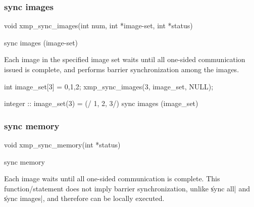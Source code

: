 



\subsubsection{sync images}

\begin{XCexample}
void xmp_sync_images(int num, int *image-set, int *status)
\end{XCexample}

\begin{XFexample}
sync images (image-set)
\end{XFexample}

Each image in the specified image set waits until all one-sided
communication issued is complete, and performs barrier synchronization
among the images.

\begin{XCexample}
int image_set[3] = {0,1,2};
xmp_sync_images(3, image_set, NULL);
\end{XCexample}

\begin{XFexample}
integer :: image_set(3) = (/ 1, 2, 3/)
sync images (image_set)
\end{XFexample}


\subsubsection{sync memory}

\begin{XCexample}
void xmp_sync_memory(int *status)
\end{XCexample}

\begin{XFexample}
sync memory
\end{XFexample}

Each image waits until all one-sided communication is complete. This
function/statement does not imply barrier synchronization, unlike
\|sync all| and \|sync images|, and therefore can be locally executed. 

